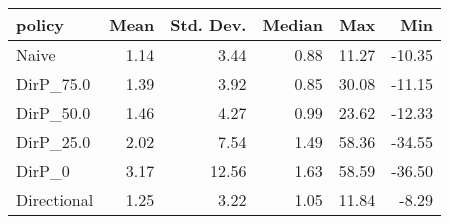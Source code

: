 \begin{tabular}{lrrrrr}
\toprule
     policy &  Mean &  Std. Dev. &  Median &   Max &    Min \\
\midrule
      Naive &  1.14 &       3.44 &    0.88 & 11.27 & -10.35 \\
  DirP\_75.0 &  1.39 &       3.92 &    0.85 & 30.08 & -11.15 \\
  DirP\_50.0 &  1.46 &       4.27 &    0.99 & 23.62 & -12.33 \\
  DirP\_25.0 &  2.02 &       7.54 &    1.49 & 58.36 & -34.55 \\
     DirP\_0 &  3.17 &      12.56 &    1.63 & 58.59 & -36.50 \\
Directional &  1.25 &       3.22 &    1.05 & 11.84 &  -8.29 \\
\bottomrule
\end{tabular}
